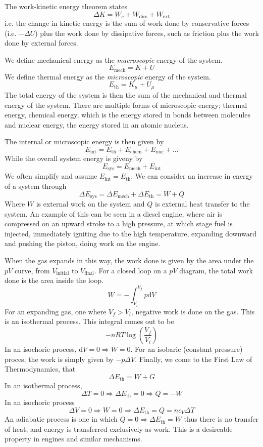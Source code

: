 \documentclass[12pt]{report}
\begin{document}
\begin{flushleft}
The work-kinetic energy theorem states
\[\Delta K = W_c + W_\mathrm{diss} + W_\mathrm{ext}\]
i.e. the change in kinetic energy is the sum of work done by conservative
forces (i.e. \(-\Delta U\)) plus the work done by dissipative forces, such as
friction plus the work done by external forces. \par
We define mechanical energy as the \textit{macroscopic} energy of the system.
\[E_\mathrm{mech} = K + U\]
We define thermal energy as the \textit{microscopic} energy of the system.
\[E_\mathrm{th} = K_\mu + U_\mu\]
The total energy of the system is then the sum of the mechanical and thermal
energy of the system. There are multiple forms of microscopic energy; thermal
energy, chemical energy, which is the energy stored in bonds between molecules
and nuclear energy, the energy stored in an atomic nucleus. \par
The internal or microscopic energy is then given by
\[E_\mathrm{int} = E_\mathrm{th} + E_\mathrm{chem} + E_\mathrm{nuc} + \ldots\]
While the overall system energy is giveny by
\[E_\mathrm{sys} = E_\mathrm{mech} + E_\mathrm{int}\]
We often simplify and assume \(E_\mathrm{int} = E_\mathrm{th}\). We can
consider an increase in energy of a system through
\[\Delta E_\mathrm{sys} = \Delta E_\mathrm{mech} + \Delta E_\mathrm{th}
= W + Q\]
Where \(W\) is external work on the system and \(Q\) is external heat transfer
to the system. An example of this can be seen in a diesel engine, where air is
compressed on an upward stroke to a high pressure, at which stage fuel is
injected, immediately igniting due to the high temperature, expanding downward
and pushing the piston, doing work on the engine. \par
When the gas expands in this way, the work done is given by the area under the
\(pV\) curve, from \(V_\mathrm{initial}\) to \(V_\mathrm{final}\). For a closed
loop on a \(pV\) diagram, the total work done is the area inside the loop.
\[W = -\int_{V_i}^{V_f} p\mathrm{d}V\]
For an expanding gas, one where \(V_f > V_i\), negative work is done on the
gas. This is an isothermal process. This integral comes out to be
\[-nRT\log\left(\frac{V_f}{V_i}\right)\]
In an isochoric process,
\(\mathrm{d}V = 0 \Rightarrow W = 0\). For an isobaric (constant pressure)
proces, the work is simply given by \(-p\Delta V\). Finally, we come to the
First Law of Thermodynamics, that
\[\Delta E_\mathrm{th} = W + G\]
In an isothermal process,
\[\Delta T = 0 \Rightarrow \Delta E_\mathrm{th} = 0 \Rightarrow Q = -W\]
In an isochoric process
\[\Delta V = 0 \Rightarrow W = 0 \Rightarrow \Delta E_\mathrm{th} = Q 
= nc_V\Delta T\]
An adiabatic process is one in which \(Q = 0 \Rightarrow \Delta 
E_\mathrm{th} = W\) thus there is no transfer of heat, and energy is
transferred exclusively as work. This is a desireable property in engines and
similar mechanisms.


\end{flushleft}
\end{document}
